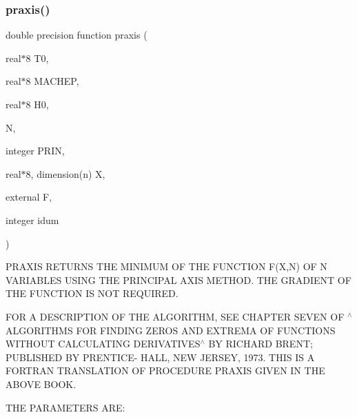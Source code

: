 \subsubsection{\texorpdfstring{praxis()}{praxis()}}
{\footnotesize\ttfamily double precision function praxis (\begin{DoxyParamCaption}\item[{real$\ast$8}]{T0,  }\item[{real$\ast$8}]{M\+A\+C\+H\+EP,  }\item[{real$\ast$8}]{H0,  }\item[{}]{N,  }\item[{integer}]{P\+R\+IN,  }\item[{real$\ast$8, dimension(n)}]{X,  }\item[{external}]{F,  }\item[{integer}]{idum }\end{DoxyParamCaption})}



P\+R\+A\+X\+IS R\+E\+T\+U\+R\+NS T\+HE M\+I\+N\+I\+M\+UM OF T\+HE F\+U\+N\+C\+T\+I\+ON F(\+X,\+N) OF N V\+A\+R\+I\+A\+B\+L\+ES U\+S\+I\+NG T\+HE P\+R\+I\+N\+C\+I\+P\+AL A\+X\+IS M\+E\+T\+H\+OD. T\+HE G\+R\+A\+D\+I\+E\+NT OF T\+HE F\+U\+N\+C\+T\+I\+ON IS N\+OT R\+E\+Q\+U\+I\+R\+ED. 

F\+OR A D\+E\+S\+C\+R\+I\+P\+T\+I\+ON OF T\+HE A\+L\+G\+O\+R\+I\+T\+HM, S\+EE C\+H\+A\+P\+T\+ER S\+E\+V\+EN OF $^\wedge$\+A\+L\+G\+O\+R\+I\+T\+H\+MS F\+OR F\+I\+N\+D\+I\+NG Z\+E\+R\+OS A\+ND E\+X\+T\+R\+E\+MA OF F\+U\+N\+C\+T\+I\+O\+NS W\+I\+T\+H\+O\+UT C\+A\+L\+C\+U\+L\+A\+T\+I\+NG D\+E\+R\+I\+V\+A\+T\+I\+V\+E\+S$^\wedge$ BY R\+I\+C\+H\+A\+RD B\+R\+E\+NT; P\+U\+B\+L\+I\+S\+H\+ED BY P\+R\+E\+N\+T\+I\+C\+E-\/ H\+A\+LL, N\+EW J\+E\+R\+S\+EY, 1973. T\+H\+IS IS A F\+O\+R\+T\+R\+AN T\+R\+A\+N\+S\+L\+A\+T\+I\+ON OF P\+R\+O\+C\+E\+D\+U\+RE P\+R\+A\+X\+IS G\+I\+V\+EN IN T\+HE A\+B\+O\+VE B\+O\+OK.

\begin{DoxyVerb} THE PARAMETERS ARE:
\end{DoxyVerb}
 
